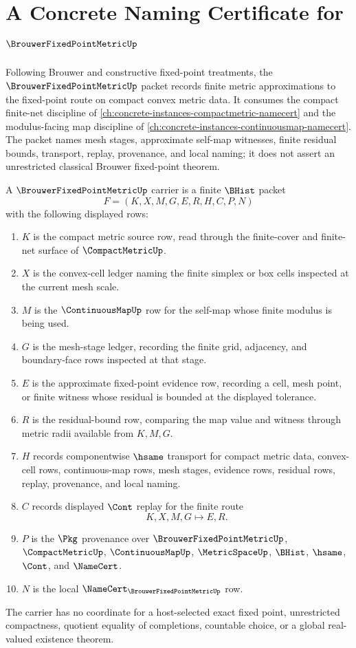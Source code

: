 \chapter{A Concrete Naming Certificate for $\BrouwerFixedPointMetricUp$}
\label{ch:concrete-instances-brouwer-fixed-point-metric-namecert}

Following Brouwer and constructive fixed-point treatments, the $\BrouwerFixedPointMetricUp$ packet records finite metric approximations to the fixed-point route on compact convex metric data. It consumes the compact finite-net discipline of \autoref{ch:concrete-instances-compactmetric-namecert} and the modulus-facing map discipline of \autoref{ch:concrete-instances-continuousmap-namecert}. The packet names mesh stages, approximate self-map witnesses, finite residual bounds, transport, replay, provenance, and local naming; it does not assert an unrestricted classical Brouwer fixed-point theorem.

\begin{definition}
\label{def:brouwer-fixed-point-metric-carrier}
A $\BrouwerFixedPointMetricUp$ carrier is a finite $\BHist$ packet
$$
F=(K,X,M,G,E,R,H,C,P,N)
$$
with the following displayed rows:
\begin{enumerate}
\item $K$ is the compact metric source row, read through the finite-cover and finite-net surface of $\CompactMetricUp$.
\item $X$ is the convex-cell ledger naming the finite simplex or box cells inspected at the current mesh scale.
\item $M$ is the $\ContinuousMapUp$ row for the self-map whose finite modulus is being used.
\item $G$ is the mesh-stage ledger, recording the finite grid, adjacency, and boundary-face rows inspected at that stage.
\item $E$ is the approximate fixed-point evidence row, recording a cell, mesh point, or finite witness whose residual is bounded at the displayed tolerance.
\item $R$ is the residual-bound row, comparing the map value and witness through metric radii available from $K,M,G$.
\item $H$ records componentwise $\hsame$ transport for compact metric data, convex-cell rows, continuous-map rows, mesh stages, evidence rows, residual rows, replay, provenance, and local naming.
\item $C$ records displayed $\Cont$ replay for the finite route
$$
K,X,M,G \longmapsto E,R .
$$
\item $P$ is the $\Pkg$ provenance over $\BrouwerFixedPointMetricUp$, $\CompactMetricUp$, $\ContinuousMapUp$, $\MetricSpaceUp$, $\BHist$, $\hsame$, $\Cont$, and $\NameCert$.
\item $N$ is the local $\NameCert_{\BrouwerFixedPointMetricUp}$ row.
\end{enumerate}
The carrier has no coordinate for a host-selected exact fixed point, unrestricted compactness, quotient equality of completions, countable choice, or a global real-valued existence theorem.
\end{definition}

